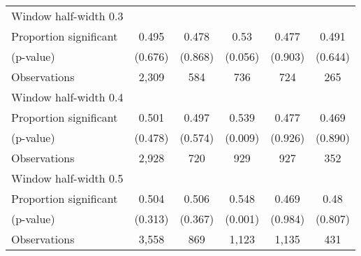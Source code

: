 \begin{tabular}{l*{5}{c}}
\hline
Window half-width 0.3\\

Proportion significant& 0.495 &  0.478 &  0.53 &  0.477 &  0.491\\

(p-value) & (0.676) &  (0.868) &  (0.056) &  (0.903) &  (0.644)\\

Observations& 2,309 &  584 &  736 &  724 &  265\\

\hline
Window half-width 0.4\\

Proportion significant& 0.501 &  0.497 &  0.539 &  0.477 &  0.469\\

(p-value) & (0.478) &  (0.574) &  (0.009) &  (0.926) &  (0.890)\\

Observations& 2,928 &  720 &  929 &  927 &  352\\

\hline
Window half-width 0.5\\

Proportion significant& 0.504 &  0.506 &  0.548 &  0.469 &  0.48\\

(p-value) & (0.313) &  (0.367) &  (0.001) &  (0.984) &  (0.807)\\

Observations& 3,558 &  869 &  1,123 &  1,135 &  431\\

\hline\hline
\end{tabular}

